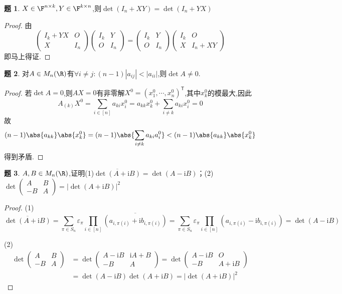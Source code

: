 \documentclass{article}
\newcommand{\T}{\mathsf{T}}
\newcommand{\matrixtwo}[4]{\begin{pmatrix}#1&#2\\#3&#4 \end{pmatrix}}
\renewcommand{\i}{\mathrm{i}}
\theoremstyle{definition}
\newtheorem{exercise}{题}[section]
\begin{document}
\begin{exercise}
    $X\in \F^{n\times k}, Y\in \F^{k\times n}$,则$\det(I_n+XY)=\det (I_n+YX)$
\end{exercise}
\begin{proof}
    由$$\matrixtwo{I_k+YX}{O}{X}{I_n}\matrixtwo{I_k}{Y}{O}{I_n}=\matrixtwo{I_k}{Y}{O}{I_n}\matrixtwo{I_k}{O}{X}{I_n+XY}$$
    即马上得证.
\end{proof}

\begin{exercise}
    对$A\in M_n(\R)$有$\forall i\neq j: (n-1)|a_{ij}|<|a_{ii}|$,则$\det A\neq 0$.
\end{exercise}
\begin{proof}
    若$\det A=0$,则$AX=0$有非零解$X^0=(x^0_1,\cdots,x^0_n)^\T$,其中$x_k^0$的模最大,因此
    $$A_{(k)}X^0=\sum_{i\in [n]}a_{ki}x^0_i=a_{kk}x^0_k+\sum_{i\neq k}a_{ki}x^0_i=0$$
    故$$(n-1)\abs{a_{kk}}\abs{x^0_k}=(n-1)\abs{\sum_{i\neq k}a_{ki}a^0_i}<(n-1)\abs{a_{kk}}\abs{x^0_k}$$
    得到矛盾.
\end{proof}

\begin{exercise}
    $A,B\in M_n(\R)$,证明(1)$\overline{\det (A+\i B)}=\det (A-\i B)$；(2)$\det \matrixtwo{A}{B}{-B}{A}=|\det(A+\i B)|^2$
\end{exercise}
\begin{proof}
    (1)$$\overline{\det (A+\i B)}=\sum_{\pi\in S_n}\varepsilon_\pi \prod_{i\in [n]}\overline{(a_{i,\pi(i)}+\i b_{i,\pi(i)})}=\sum_{\pi\in S_n}\varepsilon_\pi \prod_{i\in [n]}(a_{i,\pi(i)}-\i b_{i,\pi(i)})=\det (A-\i B)$$


    (2)$$\begin{aligned}
    \det\matrixtwo{A}{B}{-B}{A}&=\det\matrixtwo{A-\i B}{\i A+B}{-B}{A}=\det\matrixtwo{A-\i B}{O}{-B}{A+\i B}\\
    &=\det(A-\i B)\det(A+\i B)=|\det(A+\i B)|^2
    \end{aligned}$$
\end{proof}
\end{document}

